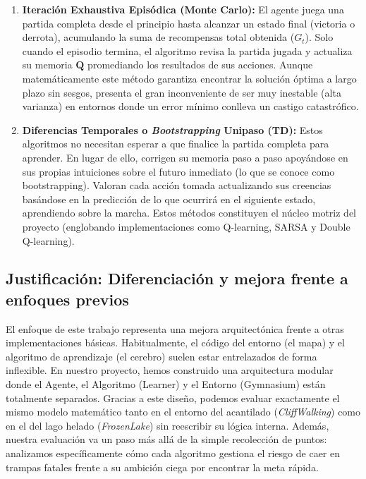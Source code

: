 \begin{enumerate}
    \item \textbf{Iteración Exhaustiva Episódica (Monte Carlo):} El agente juega una partida completa desde el principio hasta alcanzar un estado final (victoria o derrota), acumulando la suma de recompensas total obtenida ($G_t$). Solo cuando el episodio termina, el algoritmo revisa la partida jugada y actualiza su memoria $\mathbf{Q}$ promediando los resultados de sus acciones. Aunque matemáticamente este método garantiza encontrar la solución óptima a largo plazo sin sesgos, presenta el gran inconveniente de ser muy inestable (alta varianza) en entornos donde un error mínimo conlleva un castigo catastrófico.
    \item \textbf{Diferencias Temporales o \textit{Bootstrapping} Unipaso (TD):} Estos algoritmos no necesitan esperar a que finalice la partida completa para aprender. En lugar de ello, corrigen su memoria paso a paso apoyándose en sus propias intuiciones sobre el futuro inmediato (lo que se conoce como bootstrapping). Valoran cada acción tomada actualizando sus creencias basándose en la predicción de lo que ocurrirá en el siguiente estado, aprendiendo sobre la marcha. Estos métodos constituyen el núcleo motriz del proyecto (englobando implementaciones como Q-learning, SARSA y Double Q-learning).
\end{enumerate}

\subsection{Justificación: Diferenciación y mejora frente a enfoques previos}
El enfoque de este trabajo representa una mejora arquitectónica frente a otras implementaciones básicas. Habitualmente, el código del entorno (el mapa) y el algoritmo de aprendizaje (el cerebro) suelen estar entrelazados de forma inflexible. En nuestro proyecto, hemos construido una arquitectura modular donde el Agente, el Algoritmo (Learner) y el Entorno (Gymnasium) están totalmente separados. Gracias a este diseño, podemos evaluar exactamente el mismo modelo matemático tanto en el entorno del acantilado (\textit{CliffWalking}) como en el del lago helado (\textit{FrozenLake}) sin reescribir su lógica interna. Además, nuestra evaluación va un paso más allá de la simple recolección de puntos: analizamos específicamente cómo cada algoritmo gestiona el riesgo de caer en trampas fatales frente a su ambición ciega por encontrar la meta rápida.

